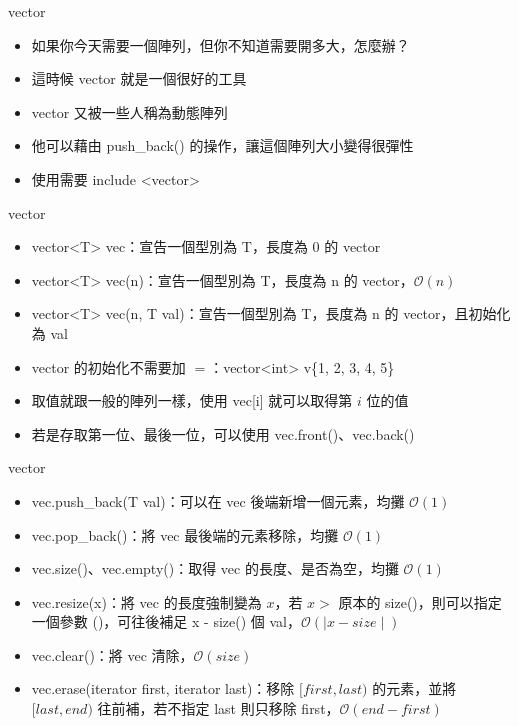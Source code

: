 \documentclass[aspectratio=169]{beamer}
\begin{document}
    \begin{frame}{vector}
        \begin{itemize}
            \item<1-> 如果你今天需要一個陣列，但你不知道需要開多大，怎麼辦？
            \item<2-> 這時候 vector 就是一個很好的工具
            \item<2-> vector 又被一些人稱為動態陣列
            \item<3-> 他可以藉由 push\_back() 的操作，讓這個陣列大小變得很彈性
            \item<4-> 使用需要 include <vector>
        \end{itemize}
    \end{frame}
    
    \begin{frame}{vector}
        \begin{itemize}
            \item<1-> vector<T> vec：宣告一個型別為 T，長度為 0 的 vector
            \item<1-> vector<T> vec(n)：宣告一個型別為 T，長度為 n 的 vector，$\mathcal{O}(n)$
            \item<1-> vector<T> vec(n, T val)：宣告一個型別為 T，長度為 n 的 vector，且初始化為 val
            \item<2-> vector 的初始化不需要加 $=$：vector<int> v\{1, 2, 3, 4, 5\}
            \item<3-> 取值就跟一般的陣列一樣，使用 vec[i] 就可以取得第 $i$ 位的值
            \item<3-> 若是存取第一位、最後一位，可以使用 vec.front()、vec.back()
        \end{itemize}
    \end{frame}

    \begin{frame}{vector}
        \begin{itemize}
            \item<1-> vec.push\_back(T val)：可以在 vec 後端新增一個元素，均攤 $\mathcal{O}(1)$
            \item<1-> vec.pop\_back()：將 vec 最後端的元素移除，均攤 $\mathcal{O}(1)$
            \item<2-> vec.size()、vec.empty()：取得 vec 的長度、是否為空，均攤 $\mathcal{O}(1)$
            \item<3-> vec.resize(x)：將 vec 的長度強制變為 $x$，若 $x >$ 原本的 size()，則可以指定一個參數 ()，可往後補足 x - size() 個 val，$\mathcal{O}(\mid x - size \mid)$
            \item<4-> vec.clear()：將 vec 清除，$\mathcal{O}(size)$
            \item<5-> vec.erase(iterator first, iterator last)：移除 $[first, last)$ 的元素，並將 $[last, end)$ 往前補，若不指定 last 則只移除 first，$\mathcal{O}(end-first)$
        \end{itemize}
    \end{frame}
\end{document}
